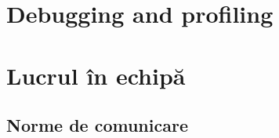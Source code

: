 % 
% 
% 
% 
% 

\section{Debugging and profiling}

\section{Lucrul în echipă}
% 
% 
% 


\subsection{Norme de comunicare}

